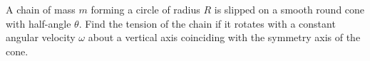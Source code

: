 \item A chain of mass $m$ forming a circle of radius $R$ is slipped on a smooth round cone with half-angle $\theta$. Find the tension of the chain if it rotates with a constant angular velocity $\omega$ about a vertical axis coinciding with the symmetry axis of the cone.